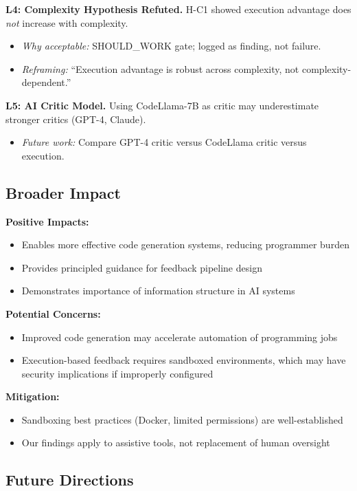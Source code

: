 \textbf{L4: Complexity Hypothesis Refuted.} H-C1 showed execution advantage does \emph{not} increase with complexity.
\begin{itemize}
\item \emph{Why acceptable:} SHOULD\_WORK gate; logged as finding, not failure.
\item \emph{Reframing:} ``Execution advantage is robust across complexity, not complexity-dependent.''
\end{itemize}

\textbf{L5: AI Critic Model.} Using CodeLlama-7B as critic may underestimate stronger critics (GPT-4, Claude).
\begin{itemize}
\item \emph{Future work:} Compare GPT-4 critic versus CodeLlama critic versus execution.
\end{itemize}

\subsection{Broader Impact}

\textbf{Positive Impacts:}
\begin{itemize}
\item Enables more effective code generation systems, reducing programmer burden
\item Provides principled guidance for feedback pipeline design
\item Demonstrates importance of information structure in AI systems
\end{itemize}

\textbf{Potential Concerns:}
\begin{itemize}
\item Improved code generation may accelerate automation of programming jobs
\item Execution-based feedback requires sandboxed environments, which may have security implications if improperly configured
\end{itemize}

\textbf{Mitigation:}
\begin{itemize}
\item Sandboxing best practices (Docker, limited permissions) are well-established
\item Our findings apply to assistive tools, not replacement of human oversight
\end{itemize}

\subsection{Future Directions}

